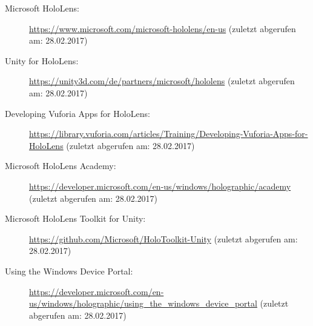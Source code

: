 \begin{description}

\item[Microsoft HoloLens:]
\url{https://www.microsoft.com/microsoft-hololens/en-us}
(zuletzt abgerufen am: 28.02.2017)

\item[Unity for HoloLens:] 
\url{https://unity3d.com/de/partners/microsoft/hololens}
(zuletzt abgerufen am: 28.02.2017)

\item[Developing Vuforia Apps for HoloLens:]
\url{https://library.vuforia.com/articles/Training/Developing-Vuforia-Apps-for-HoloLens}
(zuletzt abgerufen am: 28.02.2017)

\item[Microsoft HoloLens Academy:]
\url{https://developer.microsoft.com/en-us/windows/holographic/academy}
(zuletzt abgerufen am: 28.02.2017)

\item[Microsoft HoloLens Toolkit for Unity:]
\url{https://github.com/Microsoft/HoloToolkit-Unity}
(zuletzt abgerufen am: 28.02.2017)

\item[Using the Windows Device Portal:]
\url{https://developer.microsoft.com/en-us/windows/holographic/using_the_windows_device_portal}
(zuletzt abgerufen am: 28.02.2017)

\end{description}
